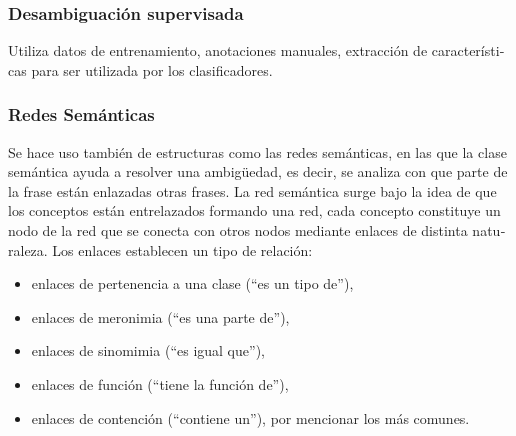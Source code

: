 \documentclass[letterpaper]{article}
\newcommand\textstylebibuscitbase[1]{#1}
\newcommand\liststyleLxi{%
\renewcommand\labelitemi{{\textbullet}}
\renewcommand\labelitemii{${\circ}$}
\renewcommand\labelitemiii{${\blacksquare}$}
\renewcommand\labelitemiv{{\textbullet}}
}
\begin{document}
\bigskip

\subsubsection[Desambiguaci\'on
supervisada]{\textstylebibuscitbase{\foreignlanguage{spanish}{\textup{Desambiguaci\'on
supervisada}}}%
}
\hypertarget{RefHeading4010985831413}{}
\bigskip

{\sffamily
\textstylebibuscitbase{\foreignlanguage{spanish}{Utiliza datos de
entrenamiento, anotaciones manuales, extracci\'on de caracter\'isticas
para ser utilizada por los clasificadores.}}}


\bigskip

\subsubsection[Redes
Sem\'anticas]{\textstylebibuscitbase{\foreignlanguage{spanish}{\textup{Redes
Sem\'anticas}}}}
\hypertarget{RefHeading334857232820}{}
\bigskip

{\sffamily
\textstylebibuscitbase{\foreignlanguage{spanish}{Se hace uso tambi\'en
de estructuras como las redes sem\'anticas, en las que la clase
sem\'antica ayuda a resolver una ambig\"uedad, es decir, se analiza con
que }}\textstylebibuscitbase{\foreignlanguage{spanish}{parte de la
frase est\'an enlazadas otras frases. La red sem\'antica surge bajo la
idea de que los conceptos est\'an entrelazados formando una red, cada
concepto constituye un nodo de la red que se conecta con otros nodos
mediante enlaces de distinta naturaleza. Los enlaces establecen un tipo
de relaci\'on:}}}


\bigskip

\liststyleLxi
\begin{itemize}
\item {\sffamily
\textstylebibuscitbase{\foreignlanguage{spanish}{enlaces de pertenencia
a una clase ({\textquotedblleft}es un tipo de{\textquotedblright}),}}}
\item {\sffamily
\textstylebibuscitbase{\foreignlanguage{spanish}{enlaces de meronimia
({\textquotedblleft}es una parte de{\textquotedblright}),}}}
\item {\sffamily
\textstylebibuscitbase{\foreignlanguage{spanish}{enlaces de sinomimia
({\textquotedblleft}es igual que{\textquotedblright}),}}}
\item {\sffamily
\textstylebibuscitbase{\foreignlanguage{spanish}{enlaces de funci\'on
({\textquotedblleft}tiene la funci\'on de{\textquotedblright}),}}}
\item {\sffamily
\textstylebibuscitbase{\foreignlanguage{spanish}{enlaces de contenci\'on
({\textquotedblleft}contiene un{\textquotedblright}), por mencionar los
m\'as comunes.}}}
\end{itemize}
\end{document}
